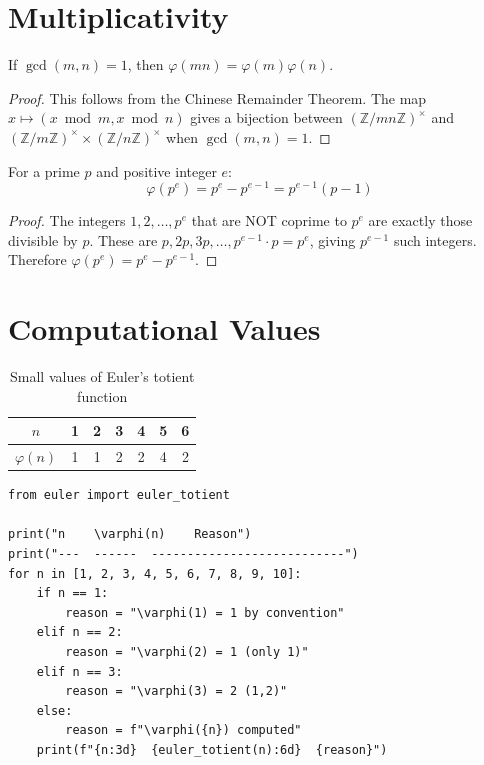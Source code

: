 \section{Multiplicativity}

\begin{theorem}
If $\gcd(m,n) = 1$, then $\varphi(mn) = \varphi(m)\varphi(n)$.
\end{theorem}

\begin{proof}
This follows from the Chinese Remainder Theorem. The map $x \mapsto (x \bmod m, x \bmod n)$
gives a bijection between $(\mathbb{Z}/mn\mathbb{Z})^\times$ and $(\mathbb{Z}/m\mathbb{Z})^\times \times (\mathbb{Z}/n\mathbb{Z})^\times$ when $\gcd(m,n) = 1$.
\end{proof}

\begin{theorem}
For a prime $p$ and positive integer $e$:
\[
\varphi(p^e) = p^e - p^{e-1} = p^{e-1}(p-1)
\]
\end{theorem}

\begin{proof}
The integers $1, 2, \ldots, p^e$ that are NOT coprime to $p^e$ are exactly those divisible by $p$.
These are $p, 2p, 3p, \ldots, p^{e-1} \cdot p = p^e$, giving $p^{e-1}$ such integers.
Therefore $\varphi(p^e) = p^e - p^{e-1}$.
\end{proof}

\section{Computational Values}

\begin{table}[H]
\centering
\begin{tabular}{c|c|c|c|c|c|c}
$n$ & 1 & 2 & 3 & 4 & 5 & 6 \\
\hline
$\varphi(n)$ & 1 & 1 & 2 & 2 & 4 & 2 \\
\end{tabular}
\caption{Small values of Euler's totient function}
\label{tab:totient_small}
\end{table}

\begin{lstlisting}[caption={Totient function values}, label=lst:totient_values]
from euler import euler_totient

print("n    \varphi(n)    Reason")
print("---  ------  ---------------------------")
for n in [1, 2, 3, 4, 5, 6, 7, 8, 9, 10]:
    if n == 1:
        reason = "\varphi(1) = 1 by convention"
    elif n == 2:
        reason = "\varphi(2) = 1 (only 1)"
    elif n == 3:
        reason = "\varphi(3) = 2 (1,2)"
    else:
        reason = f"\varphi({n}) computed"
    print(f"{n:3d}  {euler_totient(n):6d}  {reason}")
\end{lstlisting}

